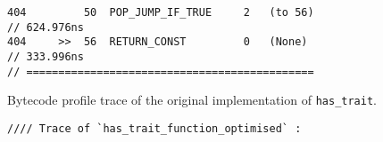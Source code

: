 \begin{code}
\begin{verbatim}
404         50  POP_JUMP_IF_TRUE     2   (to 56)                                // 624.976ns
404     >>  56  RETURN_CONST         0   (None)                                 // 333.996ns
// =============================================
    \end{verbatim}
    \caption{Bytecode profile trace of the original implementation of \texttt{has_trait}.}
    \label{listing:bytecode-profiles-hastrait-original}
\end{code}

\vspace{2em}

\begin{code}
    \begin{verbatim}
//// Trace of `has_trait_function_optimised` :


\end{verbatim}
\end{code}
